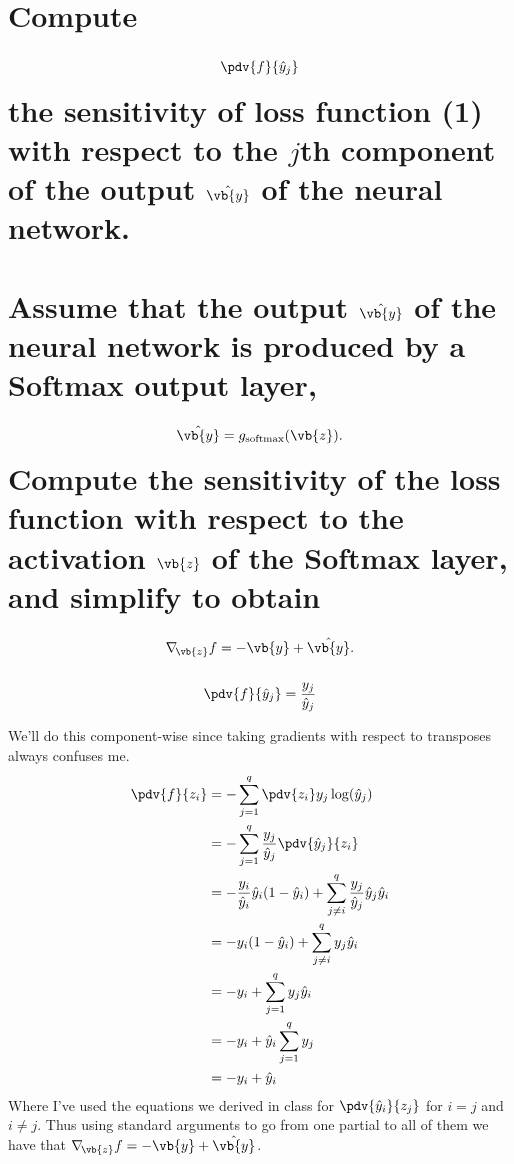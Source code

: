 \documentclass[boxes,pages]{homework}
\begin{document}
\begin{problem}
\begin{parts}
	\part{Compute \[\pdv{f}{\hat{y}_j}\] the sensitivity of loss function (1) with respect to the $j$th component of the output $\hat{\vb{y}}$ of the neural network.}\label{part:6a}
	\part{Assume that the output $\hat{\vb{y}}$ of the neural network is produced by a Softmax output layer,\[\hat{\vb{y}} = g_\text{softmax}(\vb{z}).\] Compute the sensitivity of the loss function with respect to the activation $\vb{z}$ of the Softmax layer, and simplify to obtain \[\nabla_{\!\vb{z}} f = -\vb{y} + \hat{\vb{y}}.\]}\label{part:6b}
\end{parts}
\end{problem}

\begin{solution}
	\ref{part:6a}
	\begin{equation*}
		\pdv{f}{\hat{y}_j} = \frac{y_j}{\hat{y}_j}
	\end{equation*}

	\ref{part:6b}
	We'll do this component-wise since taking gradients with respect to transposes always confuses me.
	\begin{align*}
		\pdv{f}{z_i} & = -\sum_{j = 1}^q\pdv{z_i}y_j\log(\hat{y}_j)                                                             \\
		             & = -\sum_{j = 1}^q\frac{y_j}{\hat{y}_j}\pdv{\hat{y}_j}{z_i}                                               \\
		             & = -\frac{y_i}{\hat{y}_i}\hat{y}_i(1-\hat{y}_i) + \sum_{j\neq i}^q\frac{y_j}{\hat{y}_j}\hat{y}_j\hat{y}_i \\
		             & = -y_i(1-\hat{y}_i) + \sum_{j\neq i}^qy_j\hat{y}_i                                                       \\
		             & = -y_i + \sum_{j = 1}^qy_j\hat{y}_i                                                                      \\
		             & = -y_i + \hat{y}_i\sum_{j = 1}^qy_j                                                                      \\
		             & = -y_i + \hat{y}_i
	\end{align*}
	Where I've used the equations we derived in class for $\pdv{\hat{y}_i}{z_j}$ for $i = j$ and $i \neq j$.
	Thus using standard arguments to go from one partial to all of them we have that $\nabla_{\!\vb{z}} f = -\vb{y} + \hat{\vb{y}}$.
\end{solution}
\end{document}
